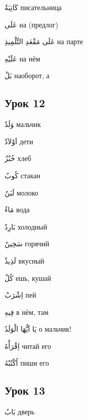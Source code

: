 \documentclass[a5paper]{article}
\newcommand\textstyleDropCaps[1]{#1}
\newcommand\textstyleCaptioncharacters[1]{#1}
\begin{document}
\textstyleCaptioncharacters{كَاتِبَةٌ }\textstyleDropCaps{писательница‎}

\textstyleCaptioncharacters{عَلَى }\textstyleDropCaps{на (предлог)‎}

\textstyleCaptioncharacters{عَلَى مَقْعَدِ التِّلْمِيذِ }\textstyleDropCaps{на парте‎}

\textstyleCaptioncharacters{عَلَيْهِ }\textstyleDropCaps{на нём‎}

\textstyleCaptioncharacters{بَلْ }\textstyleDropCaps{наоборот, а‎}

\subsection[Урок 12‎]{\textstyleDropCaps{Урок 12‎}}
\textstyleCaptioncharacters{وَلَدٌ }\textstyleDropCaps{мальчик‎}

\textstyleCaptioncharacters{اَوْلاَدٌ }\textstyleDropCaps{дети‎}

\textstyleCaptioncharacters{خُبْزٌ }\textstyleDropCaps{хлеб‎}

\textstyleCaptioncharacters{كُوبٌ }\textstyleDropCaps{стакан‎}

\textstyleCaptioncharacters{لَبَنٌ }\textstyleDropCaps{молоко‎}

\textstyleCaptioncharacters{مَاءٌ }\textstyleDropCaps{вода‎}

\textstyleCaptioncharacters{بَارِدٌ }\textstyleDropCaps{холодный‎}

\textstyleCaptioncharacters{سَخِينٌ }\textstyleDropCaps{горячий‎}

\textstyleCaptioncharacters{لَذِيذٌ }\textstyleDropCaps{вкусный‎}

\textstyleCaptioncharacters{كُلْ }\textstyleDropCaps{ешь, кушай‎}

\textstyleCaptioncharacters{اِشْرَبْ }\textstyleDropCaps{пей‎}

\textstyleCaptioncharacters{فِيهِ }\textstyleDropCaps{в нём, там‎}

\textstyleCaptioncharacters{يَا اَيُّهَا الْوَلَدُ }\textstyleDropCaps{о мальчик!‎}

\textstyleCaptioncharacters{اِقْرَأْهُ }\textstyleDropCaps{читай его‎}

\textstyleCaptioncharacters{اُكْتُبْهُ }\textstyleDropCaps{пиши его‎}

\subsection[Урок 13‎]{\textstyleDropCaps{Урок 13‎}}
\textstyleCaptioncharacters{بَابٌ }\textstyleDropCaps{дверь‎}
\end{document}
